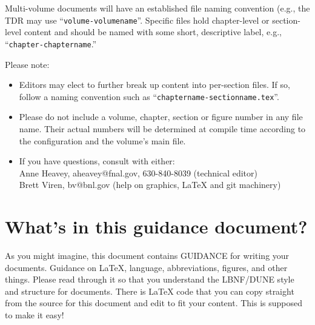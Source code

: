 Multi-volume documents will have an established file naming convention (e.g., the
TDR may use ``\texttt{volume-volumename}''.
Specific files hold chapter-level or section-level content and should be named with some
short, descriptive label, e.g., ``\texttt{chapter-chaptername}.''

Please note:
\begin{itemize}
\item Editors may elect to further break up content into per-section files. If so, follow a naming convention such as ``\texttt{chaptername-sectionname.tex}''.
\item Please do not include a volume, chapter, section or figure number in any file name. Their actual numbers will be determined at compile time according to the configuration and the volume's main file. 
\item If you have questions, consult with either: \\
  Anne Heavey, aheavey@fnal.gov, 630-840-8039 (technical editor)\\
  Brett Viren, bv@bnl.gov (help on graphics, \LaTeX{} and git machinery)
\end{itemize}

\section{What's in this guidance document?}
\label{sec:gen-doc}

As you might imagine, this document contains GUIDANCE for writing your documents. Guidance on \LaTeX{}, language, abbreviations, figures, and other things. Please read through it so that you understand the LBNF/DUNE style and structure for documents.  There is \LaTeX{} code that you can copy straight from the source for this document and edit to fit your content.  This is supposed to make it easy!


